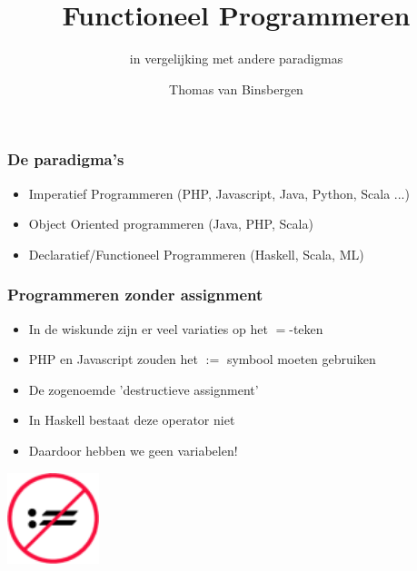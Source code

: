 \documentclass{beamer}
\title[] {Functioneel Programmeren}
\subtitle{in vergelijking met andere paradigmas}
\author {Thomas van Binsbergen}
\date {}
\begin{document}
\newcommand{\mvar}[1]{$\;\texttt{\textcolor{black}{#1}}\;$}
\newcommand{\mkey}[1]{$\;\texttt{\textcolor{orange}{#1}}\;$}
\newcommand{\mmod}[1]{$\;\texttt{\textcolor{purple}{#1}}\;$}
\newcommand{\mdef}[1]{$\;\texttt{\textcolor{blue}{#1}}\;$}
\newcommand{\mcon}[1]{$\;\texttt{\textcolor{brickred}{#1}}\;$}
\newcommand{\mtype}[1]{$\;\texttt{\textcolor{brown}{#1}}\;$}
\newcommand{\mpar}[1]{$(#1)$}
\newcommand{\mnil}[1]{\mcon{[]}}
\newcommand{\cons}[3]{\mpar{\mval{#1}\mcon{#2}\mval{#3}}}
\newcommand{\ra}[0]{$\;\rightarrow\;$}
\newcommand{\Ra}[0]{$\;\Rightarrow\;$}
\newcommand{\ind}[0]{$\;\;\;\;$}

\begin{frame}
    \titlepage
\end{frame}

\begin{frame}
    \frametitle{De paradigma's}
    \begin{itemize}
        \item Imperatief Programmeren (PHP, Javascript, Java, Python, Scala ...)
        \item Object Oriented programmeren (Java, PHP, Scala)
        \item Declaratief/Functioneel Programmeren (Haskell, Scala, ML)
    \end{itemize}
\end{frame}

\begin{frame}
    \frametitle{Programmeren zonder assignment}
    \begin{itemize}
        \item In de wiskunde zijn er veel variaties op het $=$-teken
        \item PHP en Javascript zouden het $:=$ symbool moeten gebruiken
        \item De zogenoemde 'destructieve assignment'
        \item In Haskell bestaat deze operator niet
        \item Daardoor hebben we geen variabelen!
    \end{itemize}
    \includegraphics[width=0.2\textwidth]{no_assignment.png}
\end{frame}
\end{document}
